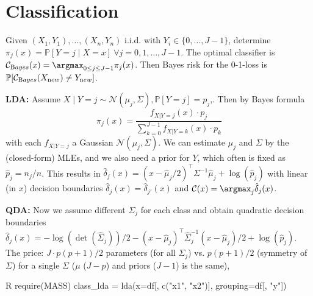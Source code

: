 \section{Classification}\label{sec:classification}
Given $(X_1, Y_1), \dots, (X_n,Y_n)$ i.i.d. with $Y_i \in \{0, \dots, J-1\}$, determine $\pi_j(x) = \mathbb{P}[Y=j\mid X=x]\ \forall j = 0,1,\dots,J-1$.
The optimal classifier is $\mathcal{C}_{\textrm Bayes}(x) = \argmax_{0\leq j\leq J-1}\pi_j(x)$.
Then Bayes risk for the 0-1-loss is $\mathbb{P}[\mathcal{C}_{\textrm Bayes}(X_{\textrm new}) \neq Y_{\textrm new}]$.

\begin{sectionbox}\nospacing{}
  \textbf{LDA: }Assume \mbox{$X \mid Y=j \sim \mathcal{N}(\mu_j, \Sigma), \mathbb{P}[Y=j] = p_j$,}.
  Then by Bayes formula $$\pi_j(x) = \frac{f_{X|Y=j}(x)\cdot p_j}{\sum_{k=0}^{J-1}f_{X|Y=k}(x)\cdot p_k}$$ with each $f_{X|Y=j}$ a Gaussian $\mathcal{N}(\mu_j, \Sigma)$.
  We can estimate $\mu_j$ and $\Sigma$ by the (closed-form) MLEs, and we also need a prior for $Y$, which often is fixed as $\hat p_j=n_j/n$.
  This results in $\hat \delta_j(x) = (x-\hat{\mu}_j/2)^{\top}\Sigma^{-1}\hat{\mu}_j+\log(\hat p_j)$ with linear (in $x$) decision boundaries $\hat{\delta}_j(x) = \hat \delta_{j'}(x)$ and $\mathcal{C}(x) = \argmax_j \hat \delta_j(x)$.

  \textbf{QDA: } Now we assume different $\Sigma_j$ for each class and obtain quadratic decision boundaries $\hat{\delta}_j(x) = -\log(\det(\hat\Sigma_j))/2 - (x-\hat{\mu}_j)^{\top}\hat{\Sigma}_j^{-1}(x-\hat{\mu}_j)/2 + \log(\hat p_j)$.
  The price: $J\cdot p(p+1)/2$ parameters (for all $\Sigma_j$) vs. $p(p+1)/2$ (symmetry of $\Sigma$) for a single $\Sigma$ ($\mu$ ($J-p$) and priors ($J-1$) is the same),
    \begin{mintlinebox}{R}
    require(MASS)
    class_lda = lda(x=df[, c("x1", "x2")], grouping=df[, "y"])
  \end{mintlinebox}
\end{sectionbox}


